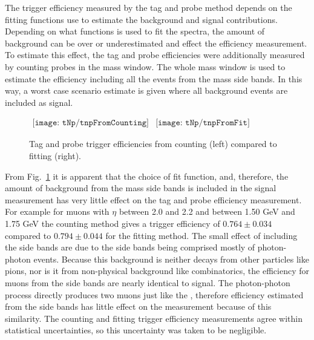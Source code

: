       The trigger efficiency measured by the tag and probe method depends on
        the fitting functions use to estimate the background and signal 
        contributions. 
      Depending on what functions is used to fit the spectra, the amount of
        background can be over or underestimated and effect the efficiency 
        measurement.
      To estimate this effect, the tag and probe efficiencies were additionally
        measured by counting probes in the \JPsi{} mass window. 
      The whole mass window is used to estimate the efficiency including all 
        the events from the mass side bands.
      In this way, a worst case scenario estimate is given where all background
        events are included as signal. 
      \begin{figure}[!Hhbt]
        \centering
        $ \begin{array}{cc}
          \texttt{[image: tNp/tnpFromCounting]} &
          \texttt{[image: tNp/tnpFromFit]}
        \end{array} $ 
        \caption{Tag and probe trigger efficiencies from counting (left) 
          compared to fitting (right).}
        \label{fig:tnpCntVFit}
      \end{figure}
  
      From Fig.~\ref{fig:tnpCntVFit} it is apparent that the choice of fit 
        function, and, therefore, the amount of background from the mass side 
        bands is included in the signal measurement has very little effect on 
        the tag and probe efficiency measurement.
      For example for muons with $\eta$ between 2.0 and 2.2 and \pt{} between
        1.50 GeV and 1.75 GeV the counting method gives a trigger efficiency 
        of $0.764 \pm 0.034$ compared to $0.794 \pm 0.044$ for the fitting 
        method. 
      The small effect of including the side bands are due to the side bands 
        being comprised mostly of photon-photon events.
      Because this background is neither decays from other particles like pions,
        nor is it from non-physical background like combinatorics, 
        the efficiency for muons from the side bands are nearly identical to
        \JPsi{} signal.
      The photon-photon process directly produces two muons just like the 
        \JPsi{}, therefore efficiency estimated from the side bands has 
        little effect on the measurement because of this similarity.
      The counting and fitting trigger efficiency measurements agree within 
        statistical uncertainties, so this uncertainty was taken to be 
        negligible.
  

